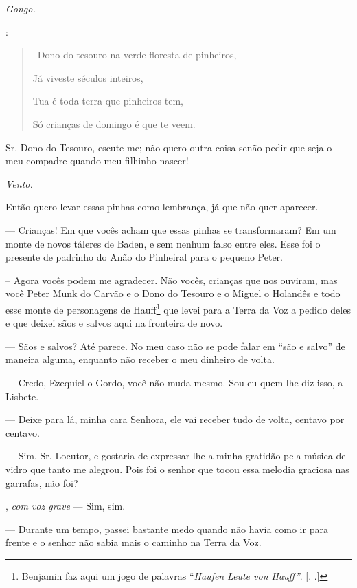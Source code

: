 \begin{myparindent}{0pt}
\begin{Parskip}
\emph{Gongo.}

:

\begin{quote}
\quad \, Dono do tesouro na verde floresta de pinheiros,

Já viveste séculos inteiros,

Tua é toda terra que pinheiros tem,

Só crianças de domingo é que te veem.

\end{quote}

Sr. Dono do Tesouro, escute-me; não quero outra coisa senão pedir que
seja o meu compadre quando meu filhinho nascer!

\emph{Vento.}

Então quero levar essas pinhas como lembrança, já que não quer aparecer.

 --- Crianças! Em que vocês acham que essas pinhas se
transformaram? Em um monte de novos táleres de Baden, e sem nenhum falso
entre eles. Esse foi o presente de padrinho do Anão do Pinheiral para o
pequeno Peter.

-- Agora vocês podem me agradecer. Não vocês, crianças que nos ouviram,
mas você Peter Munk do Carvão e o Dono do Tesouro e o Miguel o Holandês
e todo esse monte de personagens de Hauff\footnote{Benjamin faz aqui um
  jogo de palavras ``\emph{Haufen} \emph{Leute von Hauff''}. [.
  .]} que levei para a Terra da Voz a pedido deles e que deixei sãos
e salvos aqui na fronteira de novo.

 --- Sãos e salvos? Até parece. No meu caso não se pode falar em
``são e salvo'' de maneira alguma, enquanto não receber o meu dinheiro
de volta.

 --- Credo, Ezequiel o Gordo, você não muda mesmo. Sou eu quem lhe
diz isso, a Lisbete.

 --- Deixe para lá, minha cara Senhora, ele vai receber tudo de
volta, centavo por centavo.

 --- Sim, Sr. Locutor, e gostaria de expressar-lhe a minha
gratidão pela música de vidro que tanto me alegrou. Pois foi o senhor
que tocou essa melodia graciosa nas garrafas, não foi?

, \emph{com voz grave} --- Sim, sim.

 --- Durante um tempo, passei bastante medo quando não havia como
ir para frente e o senhor não sabia mais o caminho na Terra da Voz.


\end{Parskip}
\end{myparindent}
